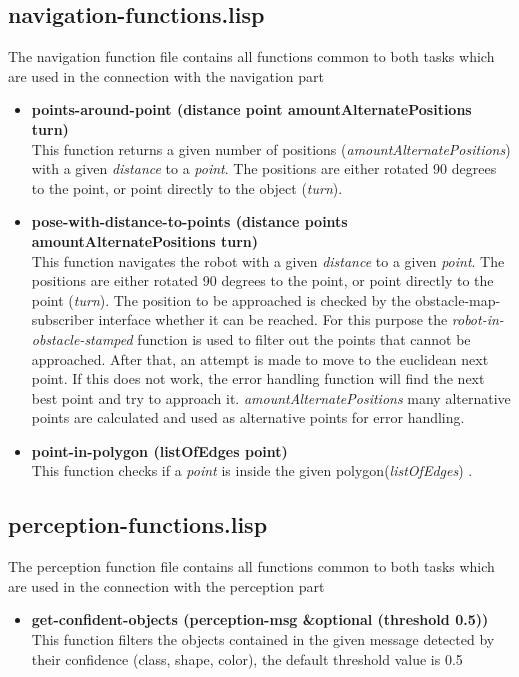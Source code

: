 \documentclass[main.tex]{subfiles}
\begin{document}
        \subsection{navigation-functions.lisp}
        The navigation function file contains all functions common to both tasks which are used in the connection with the navigation part
        \begin{itemize}
            \item \textbf{points-around-point (distance point amountAlternatePositions turn)} \\
            This function returns a given number of positions (\textit{amountAlternatePositions}) with a given \textit{distance} to a \textit{point}. The positions are either rotated 90 degrees to the point, or point directly to the object (\textit{turn}).
            \item \textbf{pose-with-distance-to-points (distance points amountAlternatePositions turn)} \\
            This function navigates the robot with a given \textit{distance} to a given \textit{point}. The positions are either rotated 90 degrees to the point, or point directly to the point (\textit{turn}). The position to be approached is checked by the obstacle-map-subscriber interface whether it can be reached. For this purpose the \textit{robot-in-obstacle-stamped} function is used to filter out the points that cannot be approached. After that, an attempt is made to move to the euclidean next point. If this does not work, the error handling function will find the next best point and try to approach it. \textit{amountAlternatePositions} many alternative points are calculated and used as alternative points for error handling. 
            \item \textbf{point-in-polygon (listOfEdges point)} \\
            This function checks if a \textit{point} is inside the given polygon(\textit{listOfEdges}) .
        \end{itemize}
        \subsection{perception-functions.lisp}
        The perception function file contains all functions common to both tasks which are used in the connection with the perception part
        \begin{itemize}
            \item \textbf{get-confident-objects (perception-msg \&optional (threshold 0.5))} \\
            This function filters the objects contained in the given message detected by their confidence (class, shape, color), the default threshold value is 0.5
        \end{itemize}
\end{document}
